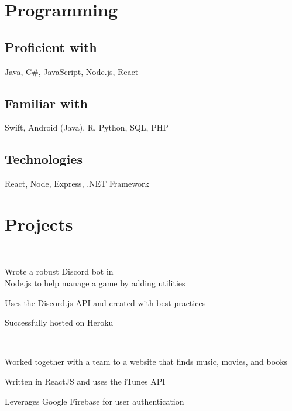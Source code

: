 \documentclass[]{deedy-resume-openfont}
\begin{document}
\begin{minipage}[t]{0.39\textwidth}
\section{Programming}
\subsection{Proficient with}
Java, C\#, JavaScript, Node.js, React \\ 
\sectionsep
\subsection{Familiar with}
Swift, Android (Java), R, Python, SQL, PHP \\
\sectionsep
\subsection{Technologies}
React, Node, Express, .NET Framework \\
\sectionsep


\section{Projects}

 \\
\vspace{\topsep} %
\begin{tightemize}
\item Wrote a robust Discord bot in \\ Node.js to help manage a game by adding utilities
\item Uses the Discord.js API and created with best practices
\item Successfully hosted on Heroku
\end{tightemize}
\sectionsep

 \\
\vspace{\topsep} %
\begin{tightemize}
\item Worked together with a team to a website that finds music, movies, and books
\item Written in ReactJS and uses the iTunes API
\item Leverages Google Firebase for user authentication
\end{tightemize}
\sectionsep


%
%

\end{minipage} 
\end{document}
